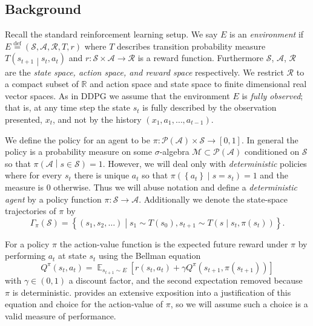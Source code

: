 \documentclass{article} %
\numberwithin{equation}{subsection}
\numberwithin{theorem}{subsection}
\def\expect{\mathop{{\mathbb{E}}}}
\newcommand{\set}[1]{ \left\{ #1 \right\} }
\def\suchthat{\mathrel{}\middle|\mathrel{}}
\def\defeq{\stackrel{\text{def}}{=}}
\def\scriptm{{\mathcal M}}
\def\scripta{{\mathcal A}}
\def\scriptr{{\mathcal R}}
\def\scriptp{{\mathcal P}}
\def\scripts{{\mathcal S}}
\begin{document}
\subsection{Background}
Recall the standard reinforcement learning setup. We say $E$ is an \emph{environment} if $E \defeq (\scripts, \scripta, \scriptr, T, r)$ where $T$ describes transition probability measure $T\left(s_{t+1}\suchthat s_t, a_t\right)$ and $r: \scripts \times \scripta \to \scriptr$ is a reward function. Furthermore $\scripts$, $\scripta$, $\scriptr$ are the \emph{state space, action space, and reward space} respectively. We restrict $\scriptr$ to a compact subset of $\mathbb{R}$ and action space and state space to finite dimensional real vector spaces. As in DDPG we assume that the environment $E$ is \emph{fully observed}; that is, at any time step the state $s_t$ is fully described by the observation presented, $x_t$, and not by the history $(x_1, a_1, \dots, a_{t-1}).$

We define the policy for an agent to be $\pi: \scriptp(\scripta) \times \scripts \to [0,1]$. In general the policy is a probability measure on some $\sigma$-algebra $\scriptm \subset \scriptp(\scripta)$ conditioned on $\scripts$ so that $\pi\left(\scripta \suchthat s \in \scripts\right) = 1$. However, we will deal only with \emph{deterministic} policies where for every $s_t$ there is unique $a_t$ so that $\pi\left(\set{a_t} \suchthat s = s_t\right) = 1$ and the measure is $0$ otherwise. Thus we will abuse notation and define a \emph{deterministic agent} by a policy function $\pi: \scripts \to \scripta$. Additionally we denote the state-space trajectories of $\pi $ by
\begin{equation}
 	\Gamma_\pi(\scripts) = \set{(s_1, s_2, \dots)\suchthat s_1 \sim T(s_0), s_{t+1} \sim T\left(s \suchthat s_t, \pi(s_t)\right)}.
 \end{equation}

For a policy $\pi$  the action-value function is the expected future reward under $\pi$ by performing $a_t$ at state $s_t$ using the Bellman equation
\begin{equation}
    Q^{\pi}(s_t, a_t) = \expect_{s_{t+1} \sim E}\left[r(s_{t}, a_t) + \gamma Q^{\pi}(s_{t+1}, \pi(s_{t+1}))\right]
\end{equation}
with $\gamma \in (0,1)$ a discount factor, and the second expectation removed because $\pi$ is deterministic.  provides an extensive exposition into a justification of this equation and choice for the action-value of $\pi$, so we will assume such a choice is a valid measure of performance.
\end{document}
